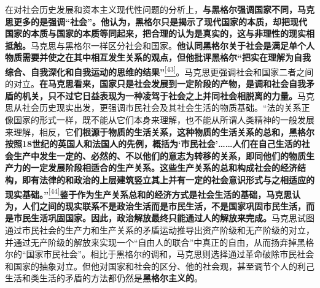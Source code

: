 \documentclass[UTF8, fontset = sourcesans, a4paper, oneside, zihao =
-4, scheme=chinese, no-math, space=true]{ctexbook}
\begin{document}
在对社会历史发展和资本主义现代性问题的分析上，\textbf{与黑格尔强调国家不同，马克思更多的是强调``社会''。他认为，黑格尔只是揭示了现代国家的本质，却把现代国家的本质与国家的本质等同起来，把合理的认为是真实的，这与非理性的现实相抵触。}马克思与黑格尔一样区分社会和国家。\textbf{他认同黑格尔关于社会是满足单个人物质需要并使之在其中相互发生关系的观点，但他批评黑格尔``把实在理解为自我综合、自我深化和自我运动的思维的结果''}\protect\hypertarget{part0005_split_003.htmlux5cux23w43}{}{}\protect\hyperlink{part0005_split_003.htmlux5cux23m43}{\textsuperscript{{[}43{]}}}。马克思更强调社会和国家二者之间的对立。\textbf{在马克思看来，国家只是社会发展到一定阶段的产物，是调和社会自我矛盾的机关，只不过它日益表现为一种凌驾于社会之上并同社会相脱离的力量。}马克思从社会历史现实出发，更强调市民社会及其社会生活的物质基础。``法的关系正像国家的形式一样，既不能从它们本身来理解，也不能从所谓人类精神的一般发展来理解，相反，它\textbf{们根源于物质的生活关系，这种物质的生活关系的总和，黑格尔按照18世纪的英国人和法国人的先例，概括为`市民社会'……人们在自己生活的社会生产中发生一定的、必然的、不以他们的意志为转移的关系，即同他们的物质生产力的一定发展阶段相适合的生产关系。这些生产关系的总和构成社会的经济结构，即有法律的和政治的上层建筑竖立其上并有一定的社会意识形式与之相适应的现实基础。''}\protect\hypertarget{part0005_split_003.htmlux5cux23w44}{}{}\protect\hyperlink{part0005_split_003.htmlux5cux23m44}{\textsuperscript{{[}44{]}}}\textbf{鉴于作为生产关系总和的经济方式是社会生活的基础，马克思认为，人们之间的现实联系不是政治生活而是市民生活，不是国家巩固市民生活，而是市民生活巩固国家。因此，政治解放最终只能通过人的解放来完成。}马克思试图通过市民社会的生产力和生产关系的矛盾运动推导出资产阶级和无产阶级的对立，并通过无产阶级的解放来实现一个``自由人的联合''中真正的自由，从而扬弃掉黑格尔的``国家市民社会''。相比于黑格尔的调和，马克思则选择通过革命破除市民社会和国家的抽象对立。但他对国家和社会的区分、他的社会观，甚至调节个人的利己生活和类生活的矛盾的方法都仍然是\textbf{黑格尔主义的}。
\end{document}
